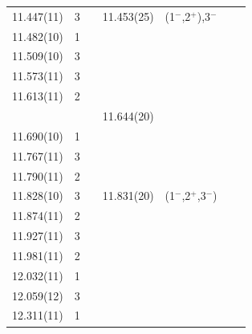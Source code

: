 \begin{center}
\begin{longtable}{cc c cc cc}
 11.447(11)     &   3   &                   &     11.453(25)    &(1$^-$,2$^+$),3$^-$&                   &                   \\
 11.482(10)     &   1   &                   &                   &                   &                   &                   \\
 11.509(10)     &   3   &                   &                   &                   &                   &                   \\
  11.573(11)    &   3   &                   &                   &                   &                   &                   \\
  11.613(11)    &   2   &                   &                   &                   &                   &                   \\
                &       &                   &     11.644(20)    &                   &                   &                   \\
   11.690(10)   &   1   &                   &                   &                   &                   &                   \\
   11.767(11)   &   3   &                   &                   &                   &                   &                   \\
   11.790(11)   &   2   &                   &                   &                   &                   &                   \\
   11.828(10)   &   3   &                   &     11.831(20)    &(1$^-$,2$^+$,3$^-$)&                   &                   \\
     11.874(11) &   2   &                   &                   &                   &                   &                   \\
    11.927(11)  &   3   &                   &                   &                   &                   &                   \\
    11.981(11)  &   2   &                   &                   &                   &                   &                   \\
     12.032(11) &   1   &                   &                   &                   &                   &                   \\
     12.059(12) &   3   &                   &                   &                   &                   &                   \\
    12.311(11)  &   1   &                   &                   &                   &                   &                   \\


    \end{longtable}
\end{center}




